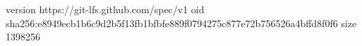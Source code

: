 version https://git-lfs.github.com/spec/v1
oid sha256:e8949ecb1b6c9d2b5f13fb1bfbfe889f0794275c877e72b756526a4bffd8f0f6
size 1398256
